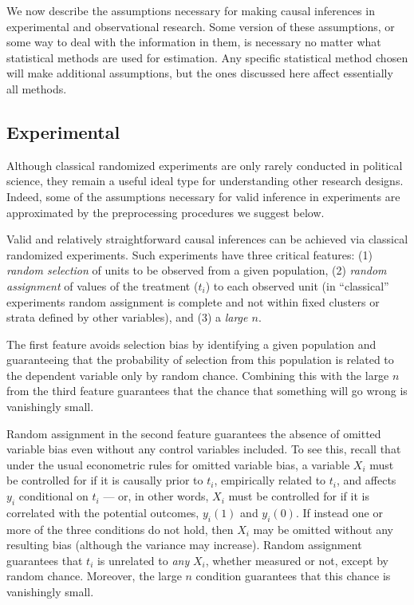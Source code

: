 \documentclass[11pt,titlepage]{article}
\begin{document}
We now describe the assumptions necessary for making causal inferences
in experimental and observational research.  Some version of these
assumptions, or some way to deal with the information in them, is
necessary no matter what statistical methods are used for estimation.
Any specific statistical method chosen will make additional
assumptions, but the ones discussed here affect essentially all
methods.

\subsection{Experimental}

Although classical randomized experiments are only rarely conducted in
political science, they remain a useful ideal type for understanding
other research designs.  Indeed, some of the assumptions necessary for
valid inference in experiments are approximated by the preprocessing
procedures we suggest below.

Valid and relatively straightforward causal inferences can be achieved
via classical randomized experiments.  Such experiments have three
critical features: (1) \emph{random selection} of units to be observed
from a given population, (2) \emph{random assignment} of values of the
treatment ($t_i$) to each observed unit (in ``classical'' experiments
random assignment is complete and not within fixed clusters or strata
defined by other variables), and (3) a \emph{large $n$}.

The first feature avoids selection bias by identifying a given
population and guaranteeing that the probability of selection from
this population is related to the dependent variable only by random
chance.  Combining this with the large $n$ from the third feature
guarantees that the chance that something will go wrong is vanishingly
small.

Random assignment in the second feature guarantees the absence of
omitted variable bias even without any control variables included.  To
see this, recall that under the usual econometric rules for omitted
variable bias, a variable $X_i$ must be controlled for if it is
causally prior to $t_i$, empirically related to $t_i$, and affects
$y_i$ conditional on $t_i$ --- or, in other words, $X_i$ must be
controlled for if it is correlated with the potential outcomes,
$y_i(1)$ and $y_i(0)$.  If instead one or more of the three conditions
do not hold, then $X_i$ may be omitted without any resulting bias
(although the variance may increase).  Random assignment guarantees
that $t_i$ is unrelated to \emph{any} $X_i$, whether measured or not,
except by random chance.  Moreover, the large $n$ condition guarantees
that this chance is vanishingly small.
\end{document}
